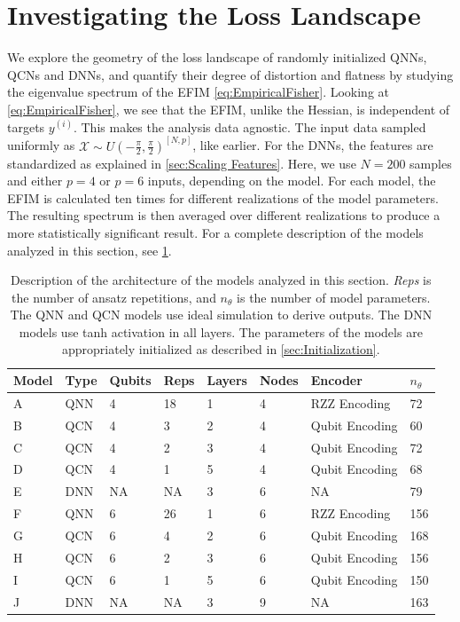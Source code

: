 \section{Investigating the Loss Landscape}\label{sec:Investigating the Loss Landscape}
We explore the geometry of the loss landscape of randomly initialized QNNs, QCNs and DNNs, and quantify their degree of distortion and flatness by studying the eigenvalue spectrum of the EFIM \cref{eq:EmpiricalFisher}. Looking at \cref{eq:EmpiricalFisher}, we see that the EFIM, unlike the Hessian, is independent of targets $y^{(i)}$. This makes the analysis data agnostic. The input data sampled uniformly as $\mathcal{X} \sim U(-\frac{\pi}{2}, \frac{\pi}{2})^{[N,p]}$, like earlier. For the DNNs, the features are standardized as explained in \cref{sec:Scaling Features}. Here, we use $N=200$ samples and either $p=4$ or $p=6$ inputs, depending on the model. For each model, the EFIM is calculated ten times for different realizations of the model parameters. The resulting spectrum is then averaged over different realizations to produce a more statistically significant result. For a complete description of the models analyzed in this section, see \cref{tab:FIM models}.

\begin{table}[H]
\caption{Description of the architecture of the models analyzed in this section. \emph{Reps} is the number of ansatz repetitions, and $n_{\theta}$ is the number of model parameters. The QNN and QCN models use ideal simulation to derive outputs. The DNN models use tanh activation in all layers. The parameters of the models are appropriately initialized as described in \cref{sec:Initialization}.} 
\centering
\begin{tabular}{|l|l|l|l|l|l|l|l|}
\hline
Model &Type & Qubits& Reps & Layers & Nodes & Encoder        & $n_{\theta}$ \\ \hline
A    & QNN & 4& 18   & 1      & 4     & RZZ Encoding   & 72  \\ \hline
B    & QCN & 4& 3    & 2      & 4     & Qubit Encoding & 60 \\ \hline
C    & QCN & 4& 2    & 3      & 4     & Qubit Encoding & 72  \\ \hline
D    & QCN & 4& 1    & 5      & 4     & Qubit Encoding & 68  \\ \hline
E    & DNN & NA& NA   & 3      & 6     & NA             & 79 \\ \hline
F    & QNN & 6& 26   & 1      & 6     & RZZ Encoding   & 156  \\ \hline
G    & QCN & 6& 4    & 2      & 6     & Qubit Encoding & 168 \\ \hline
H    & QCN & 6& 2    & 3      & 6     & Qubit Encoding & 156  \\ \hline
I    & QCN & 6& 1    & 5      & 6     & Qubit Encoding & 150  \\ \hline
J    & DNN & NA& NA   & 3      & 9     & NA             & 163 \\ \hline
\end{tabular}
\label{tab:FIM models}
\end{table}

